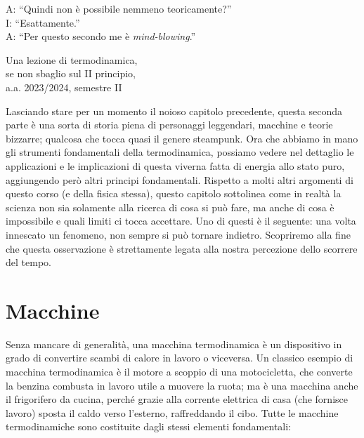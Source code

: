 \marginpar{\minitoc}

\epigraph{A: ``Quindi non è possibile nemmeno teoricamente?''\\I: ``Esattamente.''\\A: ``Per questo secondo me è \emph{mind-blowing}.''}{Una lezione di termodinamica,\\se non sbaglio sul II principio,\\a.a. 2023/2024, semestre II}

Lasciando stare per un momento il noioso capitolo precedente,
questa seconda parte è una sorta di storia piena di personaggi
leggendari, macchine e teorie bizzarre; qualcosa che tocca
quasi il genere steampunk. Ora che abbiamo in mano gli strumenti
fondamentali della termodinamica, possiamo vedere nel
dettaglio le applicazioni e le implicazioni di questa viverna
fatta di energia allo stato puro, aggiungendo però altri
principi fondamentali. Rispetto a molti altri
argomenti di questo corso (e della fisica stessa), questo
capitolo sottolinea come in realtà la scienza non sia
solamente alla ricerca di cosa si può fare, ma anche di
cosa è impossibile e quali limiti ci tocca accettare. Uno
di questi è il seguente: una
volta innescato un fenomeno, non sempre si può tornare indietro.
Scopriremo alla fine che questa osservazione è strettamente
legata alla nostra percezione dello scorrere del tempo.

\section{Macchine}
Senza mancare di generalità, una macchina termodinamica
è un dispositivo in grado di convertire scambi di calore
in lavoro o viceversa. Un classico esempio di macchina
termodinamica è il motore a scoppio di una motocicletta,
che converte la benzina combusta in lavoro utile a
muovere la ruota; ma è una macchina anche il frigorifero
da cucina, perché grazie alla corrente elettrica di
casa (che fornisce lavoro) sposta il caldo verso
l'esterno, raffreddando il cibo. Tutte le macchine
termodinamiche sono costituite dagli stessi elementi
fondamentali:

